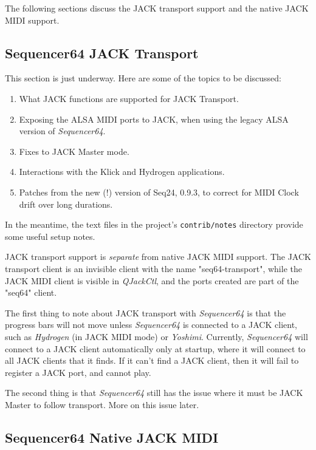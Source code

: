    The following sections discuss the JACK transport support and the native
   JACK MIDI support.

\subsection{Sequencer64 JACK Transport}
\label{subsec:seq64_jack_transport}

   This section is just underway.  Here are some of the topics to be discussed:

   \begin{enumerate}
      \item What JACK functions are supported for JACK Transport.
      \item Exposing the ALSA MIDI ports to JACK, when using the legacy
         ALSA version of \textsl{Sequencer64}.
      \item Fixes to JACK Master mode.
      \item Interactions with the Klick and Hydrogen applications.
      \item Patches from the new (!) version of Seq24, 0.9.3, to correct
         for MIDI Clock drift over long durations.
   \end{enumerate}

   In the meantime, the text files in the project's \texttt{contrib/notes}
   directory provide some useful setup notes.

   JACK transport support is \textsl{separate} from native JACK MIDI support.
   The JACK transport client is an invisible client with the
   name "seq64-transport", while the JACK MIDI client is visible in
   \textsl{QJackCtl}, and the ports created are part of the
   "seq64" client.

   The first thing to note about JACK transport with \textsl{Sequencer64} is
   that the progress bars will not move unless \textsl{Sequencer64} is
   connected to a JACK client, such as \textsl{Hydrogen} (in JACK MIDI mode)
   or \textsl{Yoshimi}.  Currently, \textsl{Sequencer64} will connect to a JACK
   client automatically only at startup, where it will connect to all JACK
   clients that it finds.  If it can't find a JACK client, then it will
   fail to register a JACK port, and cannot play.

   The second thing is that \textsl{Sequencer64} still has the issue where it
   must be JACK Master to follow transport.  More on this issue later.

\subsection{Sequencer64 Native JACK MIDI}
\label{subsec:seq64_jack_native_midi}

